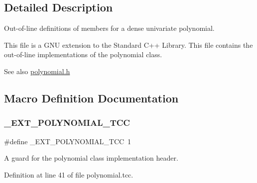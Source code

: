 \subsection{Detailed Description}
Out-\/of-\/line definitions of members for a dense univariate polynomial.

This file is a G\+NU extension to the Standard C++ Library. This file contains the out-\/of-\/line implementations of the polynomial class.

\begin{DoxySeeAlso}{See also}
\hyperlink{polynomial_8h}{polynomial.\+h} 
\end{DoxySeeAlso}


\subsection{Macro Definition Documentation}
\mbox{\label{polynomial_8tcc_af5a65c717a211a48a4cf31df10b4537a}} 
\subsubsection{\texorpdfstring{\+\_\+\+E\+X\+T\+\_\+\+P\+O\+L\+Y\+N\+O\+M\+I\+A\+L\+\_\+\+T\+CC}{\_EXT\_POLYNOMIAL\_TCC}}
{\footnotesize\ttfamily \#define \+\_\+\+E\+X\+T\+\_\+\+P\+O\+L\+Y\+N\+O\+M\+I\+A\+L\+\_\+\+T\+CC~1}



A guard for the polynomial class implementation header. 



Definition at line 41 of file polynomial.\+tcc.


